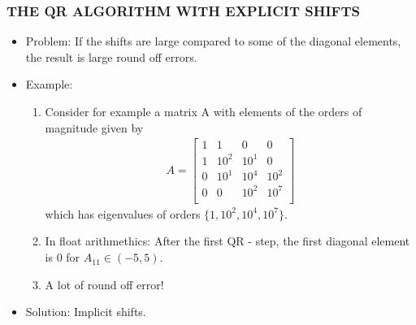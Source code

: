\documentclass[a4paper,8pt]{beamer} %
\newcommand{\smatrix}[1]{\left[\begin{matrix} #1 \end{matrix}\right]}
\begin{document}
\begin{frame}%
	\frametitle{THE QR ALGORITHM WITH EXPLICIT SHIFTS}
\begin{itemize}
	\item <1-> Problem: If the shifts are large compared to some of the diagonal elements, 
		the result is large round off errors.
	\item <2-> Example:
		\begin{enumerate}
			\item <2->
				Consider for example a matrix A with elements of the orders of
				magnitude given by
				\begin{align}
					A= \smatrix{
						1&1&0&0\\
						1&10^{2}&10^{1}&0\\
						0&10^{1}&10^{4}&10^{2}\\
						0&0&10^{2}&10^{7}\\
					}
				\end{align}
				which has eigenvalues of orders $\{1,10^2,10^4,10^{7}\}$. 
			\item <3-> In float arithmethics: After the first QR - step, 
				the first diagonal element is 0 for $A_{11}\in(-5,5)$.
			\item <4-> A lot of round off error!
		\end{enumerate}
	\item <5-> Solution: Implicit shifts.
\end{itemize}
\end{frame}%
\end{document}
